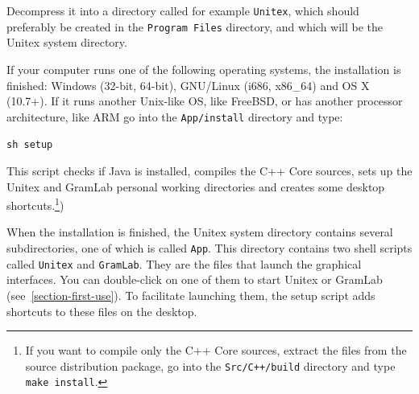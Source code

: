 \noindent Decompress it into a directory called for example {\tt Unitex\UnitexVersion{}}, which
should preferably be created in the \verb+Program Files+ directory,
and which will be the Unitex system directory.

\bigskip
\noindent If your computer runs one of the following operating systems, the installation is finished: Windows (32-bit, 64-bit), GNU/Linux (i686, x86\_64) and OS X (10.7+). If it runs another Unix-like OS, like FreeBSD, or has another processor architecture, like ARM go into the \verb+App/install+ directory and type:

\begin{flushleft}
\verb+sh setup+
\end{flushleft}

\noindent This script checks if Java is installed, compiles the C++ Core sources, sets up the
Unitex and GramLab personal working directories and creates some desktop shortcuts.\footnote{If
you want to compile only the C++ Core sources, extract the files from the source
distribution package, go into the {\tt Src/C++/build} directory and type {\tt make install}.})

\bigskip
\noindent When the installation is finished, the Unitex system directory contains several
subdirectories,  one  of which is called \verb+App+. This directory contains two
shell scripts called \verb+Unitex+ and \verb+GramLab+. They
are the files that launch the graphical interfaces. You can double-click on one of them
to start Unitex or GramLab (see~\ref{section-first-use}). To facilitate launching them,
the setup script adds shortcuts to these files on the desktop.




